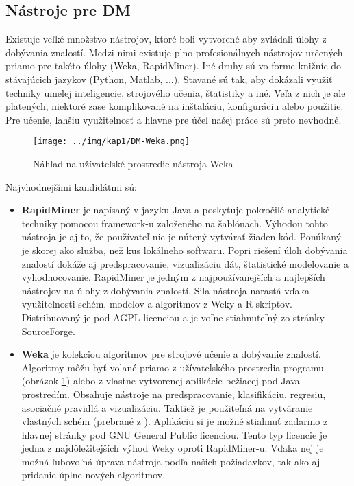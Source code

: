 \subsection{Nástroje pre DM}\label{kap1:2.2:2.2.5:Tools}
Existuje veľké množstvo nástrojov, ktoré boli vytvorené aby zvládali úlohy z dobývania znalostí. Medzi nimi existuje plno profesionálnych nástrojov určených priamo pre takéto úlohy (Weka, RapidMiner). Iné druhy sú vo forme knižníc do stávajúcich jazykov (Python, Matlab, ...). Stavané sú tak, aby dokázali využiť techniky umelej inteligencie, strojového učenia, štatistiky a iné. Veľa z nich je ale platených, niektoré zase komplikované na inštaláciu, konfiguráciu alebo použitie. Pre učenie, ľahšiu využiteľnosť a hlavne pre účel našej práce sú preto nevhodné. 

\begin{figure}[h]
\centering
\centerline{\mbox{\texttt{[image: ../img/kap1/DM-Weka.png]}}}
\caption{Náhľad na užívateľské prostredie nástroja Weka}\label{fig:dataMineWeka}
\end{figure}

Najvhodnejšími kandidátmi sú:
\begin{itemize}
\item \textbf{RapidMiner} je napísaný v jazyku Java a poskytuje pokročilé analytické techniky pomocou framework-u založeného na šablónach. Výhodou tohto nástroja je aj to, že používateľ nie je nútený vytvárať žiaden kód. Ponú\-kaný je skorej ako služba, než kus lokálneho softwaru. Popri riešení úloh dobývania znalostí dokáže aj predspracovanie, vizualizáciu dát, štatistické modelovanie a vyhodnocovanie. RapidMiner je jedným z najpoužívanejších a najlepších nástrojov na úlohy z dobývania znalostí. Sila nástroja narastá vďaka využiteľnosti schém, modelov a algoritmov z Weky a R-skriptov. Distribuovaný je pod AGPL licenciou a je voľne stiahnuteľný zo stránky SourceForge.
\item \textbf{Weka} je kolekciou algoritmov pre strojové učenie a dobývanie znalostí. Algoritmy môžu byť volané priamo z užívateľského prostredia programu (obrázok \ref{fig:dataMineWeka}) alebo z vlastne vytvorenej aplikácie bežiacej pod Java prostredím. Obsahuje nástroje na predspracovanie, klasifikáciu, regresiu, asociačné pravidlá a vizualizáciu. Taktiež je použiteľná na vytváranie vlastných schém (prebrané z \cite{online-DataMiningWeka}). Aplikáciu si je možné stiahnuť zadarmo z hlavnej stránky pod GNU General Public licenciou. Tento typ licencie je jedna z najdôležitejších výhod Weky oproti RapidMiner-u. Vďaka nej je možná ľubovoľná úprava nástroja podľa našich požiadavkov, tak ako aj pridanie úplne nových algoritmov.
\end{itemize}


